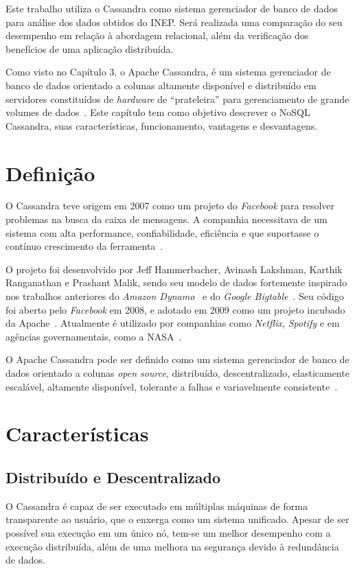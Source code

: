 Este trabalho utiliza o Cassandra como sistema gerenciador de banco de dados para análise dos dados obtidos do INEP. Será realizada uma comparação do seu desempenho em relação à abordagem relacional, além da verificação dos benefícios de uma aplicação distribuída.

Como visto no Capítulo 3, o Apache Cassandra, é um sistema gerenciador de banco de dados orientado a colunas altamente disponível e distribuído em servidores constituídos de \emph{hardware} de \enquote{prateleira} para gerenciamento de grande volumes de dados~\cite{lakshmancassandra}. Este capítulo tem como objetivo descrever o NoSQL Cassandra, suas características, funcionamento, vantagens e desvantagens.

\section{Definição}
O Cassandra teve origem em 2007 como um projeto do \emph{Facebook} para resolver problemas na busca da caixa de mensagens. A companhia necessitava de um sistema com alta performance, confiabilidade, eficiência e que suportasse o contínuo crescimento da ferramenta~\cite{lakshmancassandra}. 

O projeto foi desenvolvido por Jeff Hammerbacher, Avinash Lakshman, Karthik Ranganathan e Prashant Malik, sendo seu modelo de dados fortemente inspirado nos trabalhos anteriores do \emph{Amazon Dynamo}~\cite{dynamo} e do \emph{Google Bigtable}~\cite{bigtable}. Seu código foi aberto pelo \emph{Facebook} em 2008, e adotado em 2009 como um projeto incubado da Apache~\cite{cassandraguide}. Atualmente é utilizado por companhias como \emph{Netflix}, \emph{Spotify} e em agências governamentais, como a NASA~\cite{cassandracompanies}. 

O Apache Cassandra pode ser definido como um sistema gerenciador de banco de dados orientado a colunas \emph{open source}, distribuído, descentralizado, elasticamente escalável, altamente disponível, tolerante a falhas e variavelmente consistente~\cite{cassandraguide}.


\section{Características}

\subsection*{Distribuído e Descentralizado}
O Cassandra é capaz de ser executado em múltiplas máquinas de forma transparente ao usuário, que o enxerga como um sistema unificado. Apesar de ser possível sua execução em um único nó, tem-se um melhor desempenho com a execução distribuída, além de uma melhora na segurança devido à redundância de dados.


